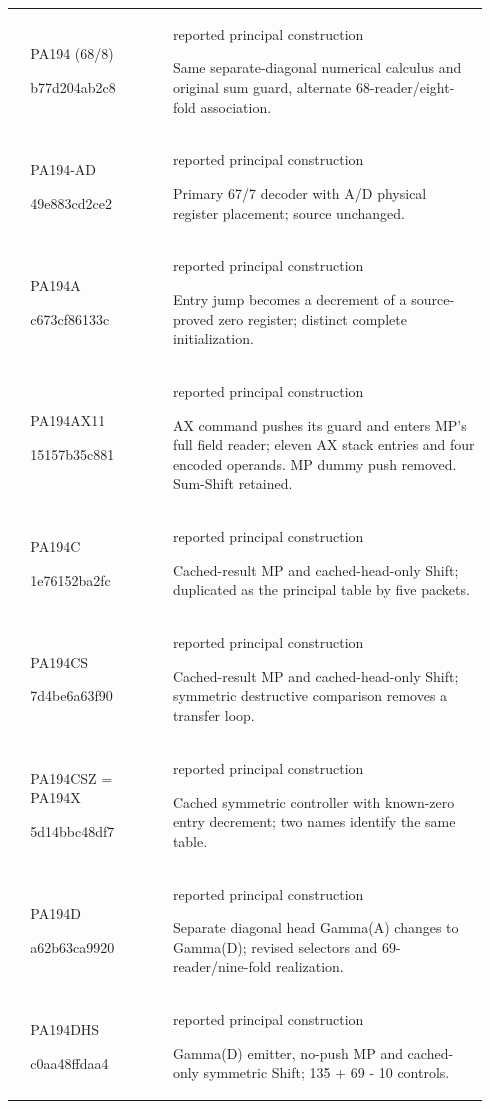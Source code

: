 {\begin{longtable}{@{}>{\raggedright\arraybackslash}p{0.035\linewidth}>{\raggedright\arraybackslash}p{0.28\linewidth}>{\raggedright\arraybackslash}p{0.625\linewidth}@{}}
9 & PA194 (68/8)\par{\ttfamily b77d204ab2c8} & reported principal construction\par Same separate-diagonal numerical calculus and original sum guard, alternate 68-reader/eight-fold association.\\[4pt]
10 & PA194-AD\par{\ttfamily 49e883cd2ce2} & reported principal construction\par Primary 67/7 decoder with A/D physical register placement; source unchanged.\\[4pt]
11 & PA194A\par{\ttfamily c673cf86133c} & reported principal construction\par Entry jump becomes a decrement of a source-proved zero register; distinct complete initialization.\\[4pt]
12 & PA194AX11\par{\ttfamily 15157b35c881} & reported principal construction\par AX command pushes its guard and enters MP's full field reader; eleven AX stack entries and four encoded operands. MP dummy push removed. Sum-Shift retained.\\[4pt]
13 & PA194C\par{\ttfamily 1e76152ba2fc} & reported principal construction\par Cached-result MP and cached-head-only Shift; duplicated as the principal table by five packets.\\[4pt]
14 & PA194CS\par{\ttfamily 7d4be6a63f90} & reported principal construction\par Cached-result MP and cached-head-only Shift; symmetric destructive comparison removes a transfer loop.\\[4pt]
15 & PA194CSZ = PA194X\par{\ttfamily 5d14bbc48df7} & reported principal construction\par Cached symmetric controller with known-zero entry decrement; two names identify the same table.\\[4pt]
16 & PA194D\par{\ttfamily a62b63ca9920} & reported principal construction\par Separate diagonal head Gamma(A) changes to Gamma(D); revised selectors and 69-reader/nine-fold realization.\\[4pt]
17 & PA194DHS\par{\ttfamily c0aa48ffdaa4} & reported principal construction\par Gamma(D) emitter, no-push MP and cached-only symmetric Shift; 135 + 69 - 10 controls.\\[4pt]

\end{longtable}}
